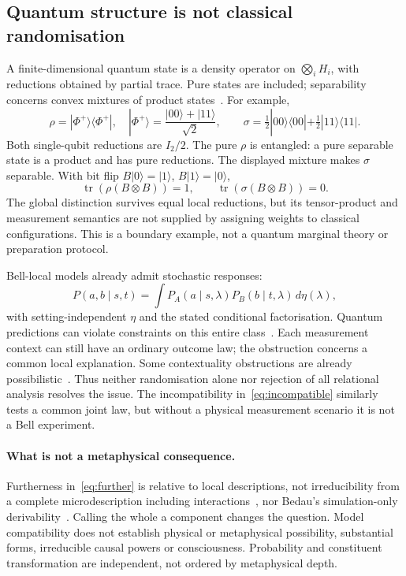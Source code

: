 \documentclass[11pt]{article}
\newcommand{\tr}{\operatorname{tr}}
\begin{document}
\subsection{Quantum structure is not classical randomisation}\label{sec:quantum}
A finite-dimensional quantum state is a density operator on $\bigotimes_i H_i$, with reductions obtained by partial trace. Pure states are included; separability concerns convex mixtures of product states~\cite{peres}. For example,
\begin{equation}\label{eq:quantum}
\rho=|\Phi^+\rangle\langle\Phi^+|,\quad |\Phi^+\rangle=\frac{|00\rangle+|11\rangle}{\sqrt2},
\qquad \sigma=\tfrac12|00\rangle\langle00|+\tfrac12|11\rangle\langle11|.
\end{equation}
Both single-qubit reductions are $I_2/2$. The pure $\rho$ is entangled: a pure separable state is a product and has pure reductions. The displayed mixture makes $\sigma$ separable. With bit flip $B|0\rangle=|1\rangle$, $B|1\rangle=|0\rangle$,
\begin{equation}\label{eq:quantumobservable}
\tr(\rho(B\otimes B))=1,\qquad \tr(\sigma(B\otimes B))=0.
\end{equation}
The global distinction survives equal local reductions, but its tensor-product and measurement semantics are not supplied by assigning weights to classical configurations. This is a boundary example, not a quantum marginal theory or preparation protocol.

Bell-local models already admit stochastic responses:
\begin{equation}\label{eq:bell}
P(a,b\mid s,t)=\int P_A(a\mid s,\lambda)P_B(b\mid t,\lambda)\,d\eta(\lambda),
\end{equation}
with setting-independent $\eta$ and the stated conditional factorisation. Quantum predictions can violate constraints on this entire class~\cite{chsh,abramsky}. Each measurement context can still have an ordinary outcome law; the obstruction concerns a common local explanation. Some contextuality obstructions are already possibilistic~\cite{abramsky}. Thus neither randomisation alone nor rejection of all relational analysis resolves the issue. The incompatibility in~\eqref{eq:incompatible} similarly tests a common joint law, but without a physical measurement scenario it is not a Bell experiment.

\paragraph{What is not a metaphysical consequence.}\label{par:metaphysics}
Furtherness in~\eqref{eq:further} is relative to local descriptions, not irreducibility from a complete microdescription including interactions~\cite{chalmers}, nor Bedau's simulation-only derivability~\cite{bedau}. Calling the whole a component changes the question. Model compatibility does not establish physical or metaphysical possibility, substantial forms, irreducible causal powers or consciousness. Probability and constituent transformation are independent, not ordered by metaphysical depth.
\end{document}
